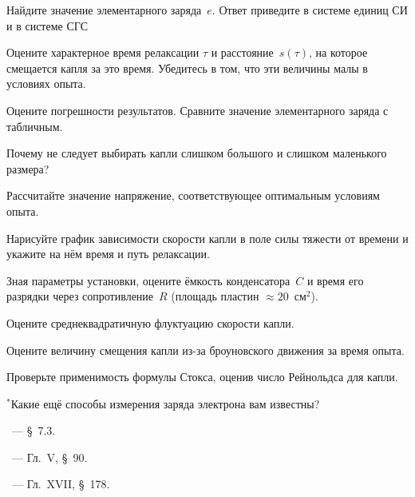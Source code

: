 \begin{lab:task}
\item Найдите значение элементарного заряда~$e$. 
Ответ приведите в системе единиц СИ и в системе СГС

\item Оцените характерное время релаксации $\tau$ и расстояние~$s(\tau)$, 
на которое смещается капля за это время. Убедитесь в том, что эти величины
малы в условиях опыта.

\item Оцените погрешности результатов. Сравните значение элементарного заряда
с табличным.

\end{lab:task}


\begin{lab:questions}
\item Почему не следует выбирать капли слишком большого и слишком маленького
размера?

\item Рассчитайте значение напряжение, соответствующее оптимальным условиям опыта.

\item Нарисуйте график зависимости скорости капли в поле силы тяжести от времени
и укажите на нём время и путь релаксации.

\item Зная параметры установки, оцените ёмкость конденсатора~$C$ и время его
разрядки через сопротивление~$R$ (площадь пластин $\approx 20$~см$^2$).

\item Оцените среднеквадратичную флуктуацию скорости капли.

\item Оцените величину смещения капли из-за броуновского движения за время опыта.

\item Проверьте применимость формулы Стокса, оценив число Рейнольдса для капли.

\item $^*$Какие ещё способы измерения заряда электрона вам известны?
\end{lab:questions}


\begin{lab:literature}
    \item \Kirichenko~--- \S~7.3.
\item \SivuhinIII~--- Гл.~V, \S~90.
\item \Kalashnikov~--- Гл.~XVII, \S~178.
\end{lab:literature}
